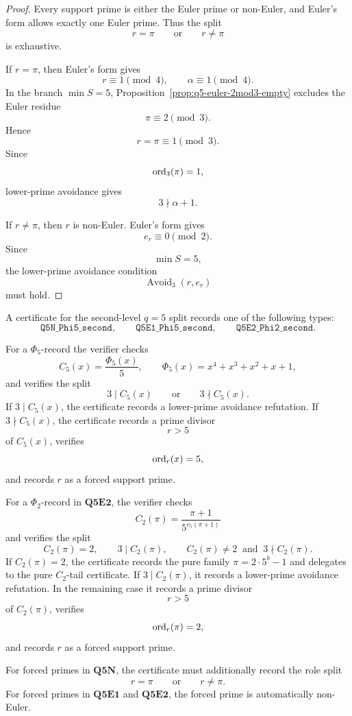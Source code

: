 \begin{proof}
Every support prime is either the Euler prime or non-Euler, and Euler's form
allows exactly one Euler prime.  Thus the split
\[
  r=\pi
  \qquad\text{or}\qquad
  r\ne\pi
\]
is exhaustive.

If \(r=\pi\), then Euler's form gives
\[
  r\equiv1\pmod4,
  \qquad
  \alpha\equiv1\pmod4.
\]
In the branch \(\min S=5\), Proposition~\ref{prop:q5-euler-2mod3-empty}
excludes the Euler residue
\[
  \pi\equiv2\pmod3.
\]
Hence
\[
  r=\pi\equiv1\pmod3.
\]
Since
\[
  \operatorname{ord}_3(\pi)=1,
\]
lower-prime avoidance gives
\[
  3\nmid\alpha+1.
\]

If \(r\ne\pi\), then \(r\) is non-Euler.  Euler's form gives
\[
  e_r\equiv0\pmod2.
\]
Since
\[
  \min S=5,
\]
the lower-prime avoidance condition
\[
  \operatorname{Avoid}_3(r,e_r)
\]
must hold.
\end{proof}

\begin{remark}[Certificate data for the second-level \(q=5\) splits]
A certificate for the second-level \(q=5\) split records one of the following
types:
\[
  \mathtt{Q5N\_Phi5\_second},
  \qquad
  \mathtt{Q5E1\_Phi5\_second},
  \qquad
  \mathtt{Q5E2\_Phi2\_second}.
\]

For a \(\Phi_5\)-record the verifier checks
\[
  C_5(x)=\frac{\Phi_5(x)}5,
  \qquad
  \Phi_5(x)=x^4+x^3+x^2+x+1,
\]
and verifies the split
\[
  3\mid C_5(x)
  \qquad\text{or}\qquad
  3\nmid C_5(x).
\]
If \(3\mid C_5(x)\), the certificate records a lower-prime avoidance
refutation.  If \(3\nmid C_5(x)\), the certificate records a prime divisor
\[
  r>5
\]
of \(C_5(x)\), verifies
\[
  \operatorname{ord}_r(x)=5,
\]
and records \(r\) as a forced support prime.

For a \(\Phi_2\)-record in \(\mathbf{Q5E2}\), the verifier checks
\[
  C_2(\pi)=\frac{\pi+1}{5^{v_5(\pi+1)}}
\]
and verifies the split
\[
  C_2(\pi)=2,
  \qquad
  3\mid C_2(\pi),
  \qquad
  C_2(\pi)\ne2\ \text{ and }\ 3\nmid C_2(\pi).
\]
If \(C_2(\pi)=2\), the certificate records the pure family
\(\pi=2\cdot5^b-1\) and delegates to the pure \(C_2\)-tail certificate.  If
\(3\mid C_2(\pi)\), it records a lower-prime avoidance refutation.  In the
remaining case it records a prime divisor
\[
  r>5
\]
of \(C_2(\pi)\), verifies
\[
  \operatorname{ord}_r(\pi)=2,
\]
and records \(r\) as a forced support prime.

For forced primes in \(\mathbf{Q5N}\), the certificate must additionally record
the role split
\[
  r=\pi
  \qquad\text{or}\qquad
  r\ne\pi.
\]
For forced primes in \(\mathbf{Q5E1}\) and \(\mathbf{Q5E2}\), the forced prime
is automatically non-Euler.
\end{remark}


